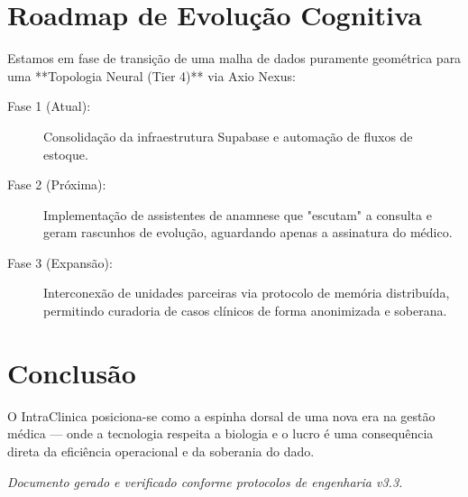 \documentclass[11pt,a4paper,oneside]{article}
\begin{document}
\section{Roadmap de Evolução Cognitiva}
Estamos em fase de transição de uma malha de dados puramente geométrica para uma **Topologia Neural (Tier 4)** via Axio Nexus:
\begin{description}
    \item[Fase 1 (Atual):] Consolidação da infraestrutura Supabase e automação de fluxos de estoque.
    \item[Fase 2 (Próxima):] Implementação de assistentes de anamnese que "escutam" a consulta e geram rascunhos de evolução, aguardando apenas a assinatura do médico.
    \item[Fase 3 (Expansão):] Interconexão de unidades parceiras via protocolo de memória distribuída, permitindo curadoria de casos clínicos de forma anonimizada e soberana.
\end{description}

\section{Conclusão}
O IntraClinica posiciona-se como a espinha dorsal de uma nova era na gestão médica — onde a tecnologia respeita a biologia e o lucro é uma consequência direta da eficiência operacional e da soberania do dado.

\vfill
\centering
\textit{Documento gerado e verificado conforme protocolos de engenharia v3.3.} 🧪🧬🏥
\end{document}
